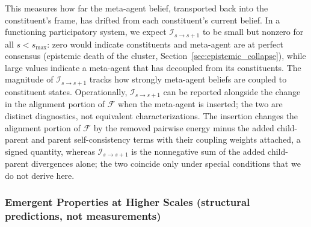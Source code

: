 \documentclass[11pt]{article}
\begin{document}
This measures how far the meta-agent belief, transported back into the constituent's frame, has drifted from each constituent's current belief. In a functioning participatory system, we expect $\mathcal{I}_{s \to s+1}$ to be small but nonzero for all $s < s_{\max}$: zero would indicate constituents and meta-agent are at perfect consensus (epistemic death of the cluster, Section~\ref{sec:epistemic_collapse}), while large values indicate a meta-agent that has decoupled from its constituents. The magnitude of $\mathcal{I}_{s \to s+1}$ tracks how strongly meta-agent beliefs are coupled to constituent states. Operationally, $\mathcal{I}_{s \to s+1}$ can be reported alongside the change in the alignment portion of $\mathcal{F}$ when the meta-agent is inserted; the two are distinct diagnostics, not equivalent characterizations. The insertion changes the alignment portion of $\mathcal{F}$ by the removed pairwise energy minus the added child-parent and parent self-consistency terms with their coupling weights attached, a signed quantity, whereas $\mathcal{I}_{s \to s+1}$ is the nonnegative sum of the added child-parent divergences alone; the two coincide only under special conditions that we do not derive here.

\subsubsection{Emergent Properties at Higher Scales (structural predictions, not measurements)}
\end{document}
